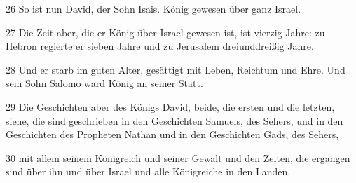 \par 26 So ist nun David, der Sohn Isais. König gewesen über ganz Israel.
\par 27 Die Zeit aber, die er König über Israel gewesen ist, ist vierzig Jahre: zu Hebron regierte er sieben Jahre und zu Jerusalem dreiunddreißig Jahre.
\par 28 Und er starb im guten Alter, gesättigt mit Leben, Reichtum und Ehre. Und sein Sohn Salomo ward König an seiner Statt.
\par 29 Die Geschichten aber des Königs David, beide, die ersten und die letzten, siehe, die sind geschrieben in den Geschichten Samuels, des Sehers, und in den Geschichten des Propheten Nathan und in den Geschichten Gads, des Sehers,
\par 30 mit allem seinem Königreich und seiner Gewalt und den Zeiten, die ergangen sind über ihn und über Israel und alle Königreiche in den Landen.


